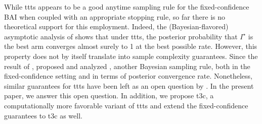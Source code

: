 While \gls{ttts} appears to be a good anytime sampling rule for the fixed-confidence BAI when coupled with an appropriate stopping rule, so far there is no theoretical support for this employment. Indeed, the (Bayesian-flavored) asymptotic analysis of \cite{russo2016ttts} shows that under \gls{ttts}, the posterior probability that $I^\star$ is the best arm converges almost surely to 1 at the best possible rate. However, this property does not by itself translate into sample complexity guarantees. Since the result of \cite{russo2016ttts}, \citet{qin2017ttei} proposed and analyzed \TTEI, another Bayesian sampling rule, both in the fixed-confidence setting and in terms of posterior convergence rate. Nonetheless, similar guarantees for \gls{ttts} have been left as an open question by \cite{russo2016ttts}. In the present paper, we answer this open question. In addition, we propose \gls{t3c}, a computationally more favorable variant of \gls{ttts} and  extend the fixed-confidence guarantees to \gls{t3c} as well.



 
